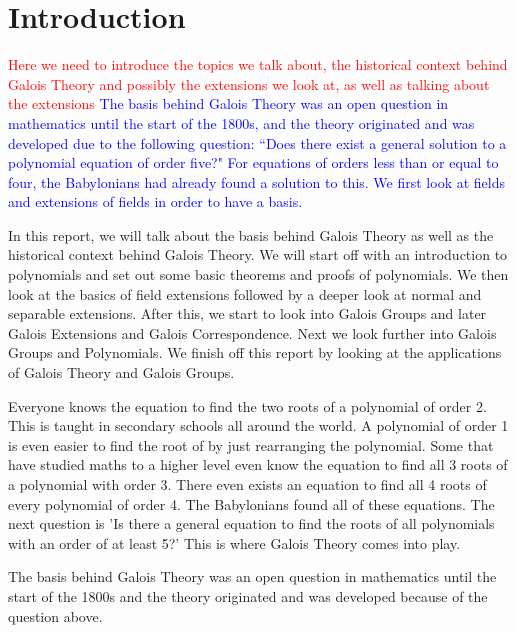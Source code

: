 \section{Introduction}
\textcolor{red}{Here we need to introduce the topics we talk about, the historical context behind Galois Theory and possibly the extensions we look at, as well as talking about the extensions}
\textcolor{blue}{The basis behind Galois Theory was an open question in mathematics until the start of the 1800s, and the theory originated and was developed due to the following question: ``Does there exist a general solution to a polynomial equation of order five?"  For equations of orders less than or equal to four, the Babylonians had already found a solution to this.
We first look at fields and extensions of fields in order to have a basis.}

In this report, we will talk about the basis behind Galois Theory as well as the historical context behind Galois Theory. We will start off with an introduction to polynomials and set out some basic theorems and proofs of polynomials. We then look at the basics of field extensions followed by a deeper look at normal and separable extensions. After this, we start to look into Galois Groups and later Galois Extensions and Galois Correspondence. Next we look further into Galois Groups and Polynomials. We finish off this report by looking at the applications of Galois Theory and Galois Groups.

Everyone knows the equation to find the two roots of a polynomial of order 2. This is taught in secondary schools all around the world. A polynomial of order 1 is even easier to find the root of by just rearranging the polynomial. Some that have studied maths to a higher level even know the equation to find all 3 roots of a polynomial with order 3. There even exists an equation to find all 4 roots of every polynomial of order 4. The Babylonians found all of these equations. The next question is 'Is there a general equation to find the roots of all polynomials with an order of at least 5?' This is where Galois Theory comes into play.

The basis behind Galois Theory was an open question in mathematics until the start of the 1800s and the theory originated and was developed because of the question above.

